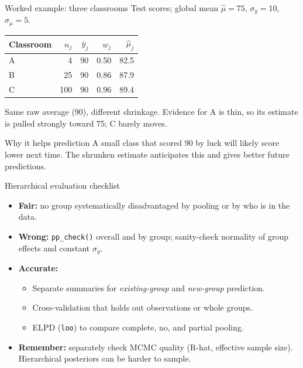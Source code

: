 \documentclass[aspectratio=43,11pt]{beamer}
\begin{document}
\begin{frame}{Worked example: three classrooms}
  Test scores; global mean $\hat\mu=75$, $\sigma_y=10$, $\sigma_\mu=5$.
  \begin{center}
  \begin{tabular}{lrrrr}
    \toprule
    Classroom & $n_j$ & $\bar y_j$ & $w_j$ & $\hat\mu_j$\\
    \midrule
    A & 4 & 90 & 0.50 & 82.5\\
    B & 25 & 90 & 0.86 & 87.9\\
    C & 100 & 90 & 0.96 & 89.4\\
    \bottomrule
  \end{tabular}
  \end{center}
  Same raw average (90), different shrinkage. Evidence for A is thin, so its estimate is pulled strongly toward 75; C barely moves.
  \begin{exampleblock}{Why it helps prediction}
    A small class that scored 90 by luck will likely score lower next time. The shrunken estimate anticipates this and gives better future predictions.
  \end{exampleblock}
\end{frame}

\begin{frame}{Hierarchical evaluation checklist}
  \begin{itemize}
    \item \textbf{Fair:} no group systematically disadvantaged by pooling or by who is in the data.
    \item \textbf{Wrong:} \texttt{pp\_check()} overall and by group; sanity-check normality of group effects and constant $\sigma_y$.
    \item \textbf{Accurate:}
      \begin{itemize}
        \item Separate summaries for \emph{existing-group} and \emph{new-group} prediction.
        \item Cross-validation that holds out observations or whole groups.
        \item ELPD (\texttt{loo}) to compare complete, no, and partial pooling.
      \end{itemize}
    \item \textbf{Remember:} separately check MCMC quality (R-hat, effective sample size). Hierarchical posteriors can be harder to sample.
  \end{itemize}
\end{frame}
\end{document}
